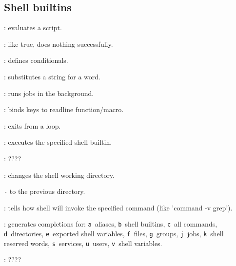 \subsection{Shell builtins}
\begin{compactenum}
\item [\symbolbash] : evaluates a script.

\item [\symbolbash] \commandbash{:}: like true, does nothing successfully.

\item [\symbolbash] \commandbash{[}: defines conditionals.

\item [\symbolbash] : substitutes a string for a word.

\item [\symbolbash] : runs jobs in the background.

\item [\symbolbash] : binds keys to readline function/macro.

\item [\symbolbash] : exits from a loop.

\item [\symbolbash] : executes the specified shell builtin.

\item [\symbolbash] : \dotfill ????

\item [\symbolbash] : changes the shell working directory.
\item [\texttt{-}] to the previous directory.

\item [\symbolbash] : tells how shell will invoke the specified command (like 'command -v grep').

\item [\symbolbash] : generates completions for: \texttt{a}~aliases, \texttt{b}~shell builtins, \texttt{c}~all commands, \texttt{d}~directories, \texttt{e}~exported shell variables, \texttt{f}~files, \texttt{g}~groups, \texttt{j}~jobs, \texttt{k}~shell reserved words, \texttt{s}~services, \texttt{u}~users, \texttt{v}~shell variables.

\item [\symbolbash] : \dotfill ????


\end{compactenum}
